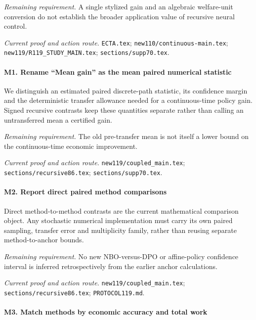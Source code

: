 \par\emph{Remaining requirement.} A single stylized gain and an algebraic welfare-unit conversion do not establish the broader application value of recursive neural control.

\par\emph{Current proof and action route.} \nolinkurl{ECTA.tex}; \nolinkurl{new110/continuous-main.tex}; \nolinkurl{new119/R119_STUDY_MAIN.tex}; \nolinkurl{sections/supp70.tex}.

\paragraph{M1. Rename “Mean gain” as the mean paired numerical statistic}

We distinguish an estimated paired discrete-path statistic, its confidence margin and the deterministic transfer allowance needed for a continuous-time policy gain. Signed recursive contrasts keep these quantities separate rather than calling an untransferred mean a certified gain.

\par\emph{Remaining requirement.} The old pre-transfer mean is not itself a lower bound on the continuous-time economic improvement.

\par\emph{Current proof and action route.} \nolinkurl{new119/coupled_main.tex}; \nolinkurl{sections/recursive86.tex}; \nolinkurl{sections/supp70.tex}.

\paragraph{M2. Report direct paired method comparisons}

Direct method-to-method contrasts are the current mathematical comparison object. Any stochastic numerical implementation must carry its own paired sampling, transfer error and multiplicity family, rather than reusing separate method-to-anchor bounds.

\par\emph{Remaining requirement.} No new NBO-versus-DPO or affine-policy confidence interval is inferred retrospectively from the earlier anchor calculations.

\par\emph{Current proof and action route.} \nolinkurl{new119/coupled_main.tex}; \nolinkurl{sections/recursive86.tex}; \nolinkurl{PROTOCOL119.md}.

\paragraph{M3. Match methods by economic accuracy and total work}

